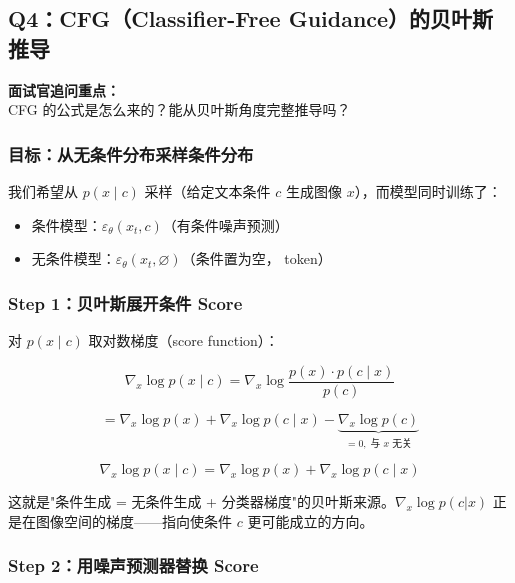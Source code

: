 \subsection{Q4：CFG（Classifier-Free Guidance）的贝叶斯推导}

\begin{warnbox}
\textbf{面试官追问重点：}\\
CFG 的公式是怎么来的？能从贝叶斯角度完整推导吗？
\end{warnbox}

\subsubsection{目标：从无条件分布采样条件分布}

我们希望从 $p(x \mid c)$ 采样（给定文本条件 $c$ 生成图像 $x$），而模型同时训练了：
\begin{itemize}[leftmargin=1.5em]
  \item 条件模型：$\varepsilon_\theta(x_t, c)$（有条件噪声预测）
  \item 无条件模型：$\varepsilon_\theta(x_t, \varnothing)$（条件置为空， token）
\end{itemize}

\subsubsection{Step 1：贝叶斯展开条件 Score}

对 $p(x \mid c)$ 取对数梯度（score function）：

\[
\nabla_x \log p(x \mid c) = \nabla_x \log \frac{p(x) \cdot p(c \mid x)}{p(c)}
\]

\[
= \nabla_x \log p(x) + \nabla_x \log p(c \mid x) - \underbrace{\nabla_x \log p(c)}_{=0,\;\text{与 }x\text{ 无关}}
\]

\[
\boxed{\nabla_x \log p(x \mid c) = \nabla_x \log p(x) + \nabla_x \log p(c \mid x)}
\]

\begin{intubox}
这就是"条件生成 = 无条件生成 + 分类器梯度"的贝叶斯来源。$\nabla_x \log p(c|x)$ 正是在图像空间的梯度——指向使条件 $c$ 更可能成立的方向。
\end{intubox}

\subsubsection{Step 2：用噪声预测器替换 Score}


